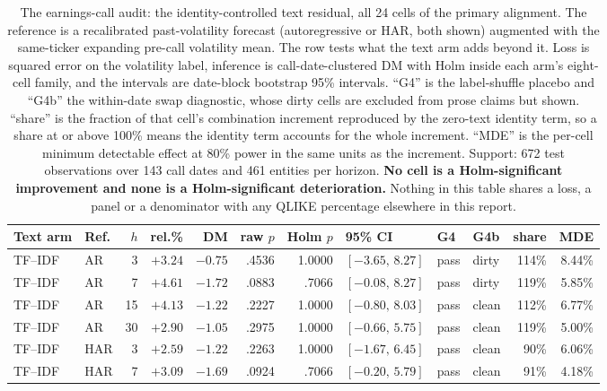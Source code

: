 \begin{table}[p]
\centering
\caption[The earnings-call identity-controlled residual, all 24 cells]{The
earnings-call audit: the identity-controlled text residual, all 24 cells of
the primary alignment. The reference is a recalibrated past-volatility
forecast (autoregressive or HAR, both shown) augmented with the
same-ticker expanding pre-call volatility mean. The row tests what the text
arm adds beyond it. Loss is squared error on the volatility label,
inference is call-date-clustered DM with Holm inside each arm's eight-cell
family, and the intervals are date-block bootstrap 95\% intervals. ``G4''
is the label-shuffle placebo and ``G4b'' the within-date swap diagnostic,
whose dirty cells are excluded from prose claims but shown. ``share'' is
the fraction of that cell's combination increment reproduced by the
zero-text identity term, so a share at or above 100\% means the identity
term accounts for the whole increment. ``MDE'' is the per-cell minimum
detectable effect at 80\% power in the same units as the increment.
Support: 672 test observations over 143 call dates and 461 entities per
horizon. \textbf{No cell is a Holm-significant improvement and none is a
Holm-significant deterioration.} Nothing in this table shares a loss, a
panel or a denominator with any QLIKE percentage elsewhere in this report.}
\label{tab:app-maec}
\singlespacing\footnotesize
\setlength{\tabcolsep}{1.8pt}
\begin{tabular}{@{}llrrrrrlllrr@{}}
\toprule
Text arm & Ref. & $h$ & rel.\% & DM & raw $p$ & Holm $p$ & 95\% CI & G4 & G4b & share & MDE \\
\midrule
TF--IDF & AR & 3 & $+3.24$ & $-0.75$ & .4536 & 1.0000 & $[-3.65,\,8.27]$ & pass & dirty & 114\% & 8.44\% \\
TF--IDF & AR & 7 & $+4.61$ & $-1.72$ & .0883 & .7066 & $[-0.08,\,8.27]$ & pass & dirty & 119\% & 5.85\% \\
TF--IDF & AR & 15 & $+4.13$ & $-1.22$ & .2227 & 1.0000 & $[-0.80,\,8.03]$ & pass & clean & 112\% & 6.77\% \\
TF--IDF & AR & 30 & $+2.90$ & $-1.05$ & .2975 & 1.0000 & $[-0.66,\,5.75]$ & pass & clean & 119\% & 5.00\% \\
\addlinespace
TF--IDF & HAR & 3 & $+2.59$ & $-1.22$ & .2263 & 1.0000 & $[-1.67,\,6.45]$ & pass & clean & 90\% & 6.06\% \\
TF--IDF & HAR & 7 & $+3.09$ & $-1.69$ & .0924 & .7066 & $[-0.20,\,5.79]$ & pass & clean & 91\% & 4.18\% \\

\end{tabular}
\end{table}
